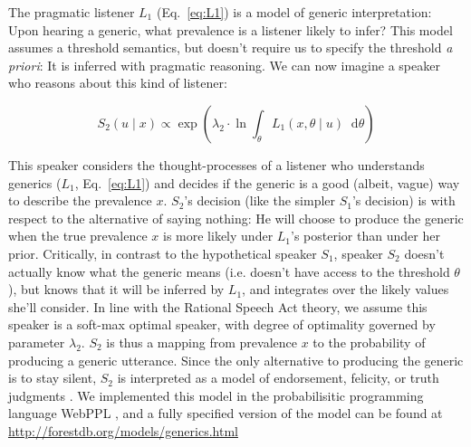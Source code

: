 \documentclass[12pt,letterpaper]{article}
\newcommand*\diff{\mathop{}\!\mathrm{d}}
\begin{document}
The pragmatic listener $L_1$ (Eq.~\ref{eq:L1}) is a model of generic interpretation: Upon hearing a generic, what prevalence is a listener likely to infer?
This model assumes a threshold semantics, but doesn't require us to specify the threshold \emph{a priori}: It is inferred with pragmatic reasoning.
We can now imagine a speaker who reasons about this kind of listener:

\begin{equation} 
S_{2}(u \mid x) \propto  \exp{(\lambda_2 \cdot \ln \int_{\theta} L_{1}(x , \theta \mid u) \diff \theta ) }%
\label{eq:S2}
\end{equation}

This speaker considers the thought-processes of a listener who understands generics ($L_1$, Eq.~\ref{eq:L1}) and decides if the generic is a good (albeit, vague) way to describe the  prevalence $x$. 
$S_2$'s decision (like the simpler $S_1$'s decision) is with respect to the alternative of saying nothing: He will choose to produce the generic when the true prevalence $x$ is more likely under $L_1$'s posterior than under her prior. 
Critically, in contrast to the hypothetical speaker $S_1$, speaker $S_{2}$ doesn't actually know what the generic means (i.e. doesn't have access to the threshold $\theta$), but knows that it will be inferred by $L_{1}$, and integrates over the likely values she'll consider.
In line with the Rational Speech Act theory, we assume this speaker is a soft-max optimal speaker, with degree of optimality governed by parameter $\lambda_2$.
$S_2$ is thus a mapping from prevalence $x$ to the probability of producing a generic utterance. 
Since the only alternative to producing the generic is to stay silent, $S_2$ is interpreted as a model of endorsement, felicity, or truth judgments \cite{Degen2014}.
We implemented this model in the probabilisitic programming language WebPPL \cite{dippl}, and a fully specified version of the model can be found at \url{http://forestdb.org/models/generics.html}
\end{document}
